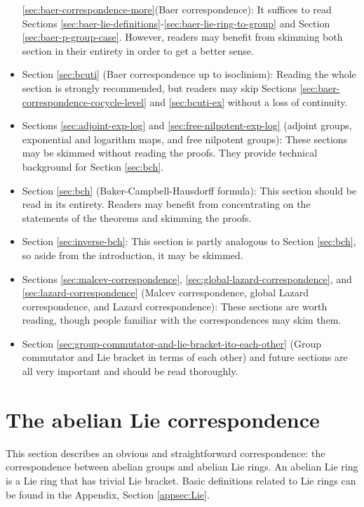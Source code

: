 \documentclass{ucetd}
\begin{document}
\begin{itemize}
  \ref{sec:baer-correspondence-more}(Baer correspondence): It suffices
  to read Sections
  \ref{sec:baer-lie-definitions}-\ref{sec:baer-lie-ring-to-group} and
  Section \ref{sec:baer-p-group-case}. However, readers may benefit
  from skimming both section in their entirety in order to get a
  better sense.
\item Section \ref{sec:bcuti} (Baer correspondence up to isoclinism):
  Reading the whole section is strongly recommended, but readers may
  skip Sections \ref{sec:baer-correspondence-cocycle-level} and
  \ref{sec:bcuti-ex} without a loss of continuity.
\item Sections \ref{sec:adjoint-exp-log} and
  \ref{sec:free-nilpotent-exp-log} (adjoint groups, exponential and
  logarithm maps, and free nilpotent groups): These sections may be
  skimmed without reading the proofs. They provide technical
  background for Section \ref{sec:bch}.
\item Section \ref{sec:bch} (Baker-Campbell-Hausdorff formula): This
  section should be read in its entirety. Readers may benefit from
  concentrating on the statements of the theorems and skimming the
  proofs.
\item Section \ref{sec:inverse-bch}: This section is partly analogous
  to Section \ref{sec:bch}, so aside from the introduction, it may be
  skimmed.
\item Sections \ref{sec:malcev-correspondence},
  \ref{sec:global-lazard-correspondence}, and
  \ref{sec:lazard-correspondence} (Malcev correspondence, global
  Lazard correspondence, and Lazard correspondence): These sections
  are worth reading, though people familiar with the correspondences
  may skim them.
\item Section
  \ref{sec:group-commutator-and-lie-bracket-ito-each-other} (Group
  commutator and Lie bracket in terms of each other) and future
  sections are all very important and should be read thoroughly.
\end{itemize}

\section{The abelian Lie correspondence}\label{sec:abelian-lie-correspondence}

This section describes an obvious and straightforward correspondence:
the correspondence between abelian groups and abelian Lie rings. An
abelian Lie ring is a Lie ring that has trivial Lie bracket. Basic
definitions related to Lie rings can be found in the Appendix, Section
\ref{appsec:Lie}.
\end{document}

